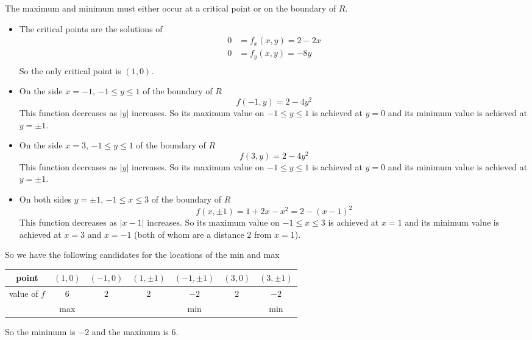 \begin{solution}
The maximum and minimum must either occur at a critical point or on
the boundary of $R$.
\begin{itemize}
\item 
The critical points are the solutions of
\begin{align*}
0&=f_x(x,y) = 2-2x \\
0&=f_y(x,y) = -8y \\ 
\end{align*} 
So the only critical point is $(1,0)$.
\item
On the side $x=-1$, $-1\le y\le 1$ of the boundary of $R$
\begin{equation*}
f(-1,y) = 2-4y^2 
\end{equation*}
This function decreases as $|y|$ increases. So its maximum value
on $-1\le y\le 1$ is achieved at $y=0$ and its minimum value is achieved
at $y=\pm 1$.

\item
On the side $x=3$, $-1\le y\le 1$ of the boundary of $R$
\begin{equation*}
f(3,y) = 2-4y^2 
\end{equation*}
This function decreases as $|y|$ increases. So its maximum value
on $-1\le y\le 1$ is achieved at $y=0$ and its minimum value is achieved
at $y=\pm 1$.

\item
On both sides $y=\pm 1$, $-1\le x\le 3$ of the boundary of $R$
\begin{equation*}
f(x,\pm 1) = 1+2x-x^2 = 2 -(x-1)^2 
\end{equation*}
This function decreases as $|x-1|$ increases. So its maximum value
on $-1\le x\le 3$ is achieved at $x=1$ and its minimum value is achieved
at $x= 3$ and $x=-1$ (both of whom are a distance $2$ from $x=1$).

\end{itemize}
So we have the following candidates for the locations of the min and max
\begin{center}
\renewcommand{\arraystretch}{1.3}
     \begin{tabular}{|c|c|c|c|c|c|c|}
     \hline
       point
       &$(1,0)$
       &$(-1,0)$ 
       &$(1,\pm 1)$ 
       &$(-1,\pm 1)$ 
       &$(3,0)$ 
       &$(3,\pm 1)$ \\ \hline
       value of $f$
       &$6$
       &$2$
       &$2$
       &$-2$
       &$2$
       &$-2$ \\ \hline
       &max 
       &    
       &  
       &min  
       &  
       &min \\ \hline
     \end{tabular}
\renewcommand{\arraystretch}{1.0}
\end{center}
So the minimum is $-2$ and the maximum is $6$.
\end{solution}

